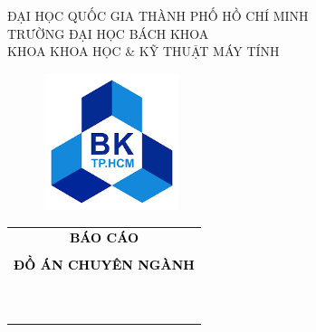 \documentclass[a4paper]{report}
\begin{document}
\begin{titlepage}
	\begin{center}
		ĐẠI HỌC QUỐC GIA THÀNH PHỐ HỒ CHÍ MINH \\
		TRƯỜNG ĐẠI HỌC BÁCH KHOA \\
		KHOA KHOA HỌC \& KỸ THUẬT MÁY TÍNH
	\end{center}
	\renewcommand{\rmdefault}{ppl}
	\vspace{1cm}
	\begin{figure}[h!]
		\begin{center}
			\includegraphics[width=4cm, height=4cm]{Pictures/logoBK.png}
		\end{center}
	\end{figure}
	\vspace{1cm}

	\begin{center}
		\begin{tabular}{c}
			\textbf{\large\textcolor{black}{BÁO CÁO}}                                    \\\\
			\textbf{\large\textcolor{black}{ĐỒ ÁN CHUYÊN NGÀNH}}                         \\\\
			~~                                                                           \\
			\hline
			\\
			\textbf{\large \color{black}{Phát triển và mở rộng}}                         \\
			\textbf{\large \color{black}{nền tảng đánh giá quy trình nghiệp vụ tự động}} \\
			\\
			\hline
		\end{tabular}
	\end{center}
	\vspace{2cm}


\end{titlepage}
\end{document}
